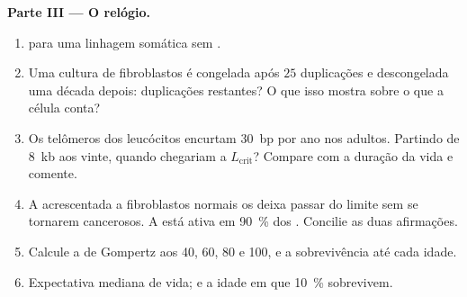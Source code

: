 \begin{problem}
\medskip
\noindent\textbf{Parte III --- O relógio.}
\begin{enumerate}[resume]
  \item {} para uma linhagem somática sem .
  \item Uma cultura de fibroblastos é congelada após $25$ duplicações e
        descongelada uma década depois: duplicações restantes? O que isso
        mostra sobre o que a célula conta?
  \item Os telômeros dos leucócitos encurtam \qty{30}{bp} por ano nos
        adultos. Partindo de \qty{8}{kb} aos vinte, quando chegariam a
        $L_{\text{crit}}$? Compare com a duração da vida e comente.
  \item A  acrescentada a fibroblastos normais os deixa passar
        do limite sem se tornarem cancerosos. A  está ativa em
        \qty{90}{\%} dos . Concilie as duas afirmações.
  \item Calcule a  de Gompertz aos 40, 60, 80 e 100, e
        a sobrevivência até cada idade.
  \item Expectativa mediana de vida; e a idade em que \qty{10}{\%}
        sobrevivem.
\end{enumerate}


\end{problem}
